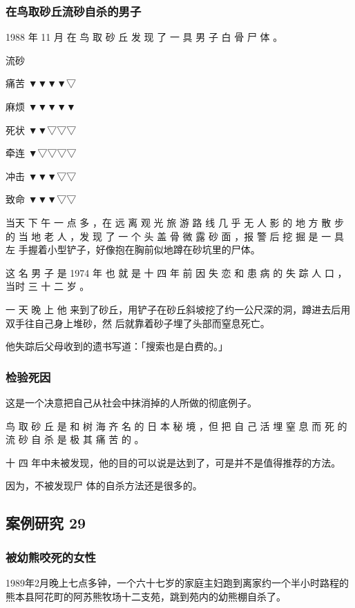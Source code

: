 \documentclass[UTF8]{ctexart}
\begin{document}
\subsubsection*{在鸟取砂丘流砂自杀的男子}

1988 年 11 月 在 鸟 取 砂 丘 发 现 了 一 具 男 子 白 骨 尸 体 。

流砂

痛苦 ▼▼▼▼▽

麻烦 ▼▼▼▼▼

死状 ▼▼▽▽▽

牵连 ▼▽▽▽▽

冲击 ▼▼▼▽▽

致命 ▼▼▼▽▽

当天 下 午 一 点 多 ，在 远 离 观 光 旅 游 路 线 几 乎 无 人 影 的 地 方 散 步 的 当 地 老 人 ，发 现 了 一 个 头 盖 骨 微 露 砂 面 ，报 警 后 挖 掘 是 一 具 左 手握着小型铲子，好像抱在胸前似地蹲在砂坑里的尸体。

这 名 男 子 是 1974 年 也 就 是 十 四 年 前 因 失 恋 和 患 病 的 失 踪 人 口 ，当时 三 十 二 岁 。

一 天 晚 上 他 来到了砂丘，用铲子在砂丘斜坡挖了约一公尺深的洞，蹲进去后用双手往自己身上堆砂，然 后就靠着砂子埋了头部而窒息死亡。 

他失踪后父母收到的遗书写道：「搜索也是白费的。」

\subsubsection*{检验死因}

这是一个决意把自己从社会中抹消掉的人所做的彻底例子。

鸟 取 砂 丘 是 和 树 海 齐 名 的 日 本 秘 境 ，但 把 自 己 活 埋 窒 息 而 死 的 流 砂 自 杀 是 极 其 痛 苦 的 。

十 四 年中未被发现，他的目的可以说是达到了，可是并不是值得推荐的方法。

因为，不被发现尸 体的自杀方法还是很多的。


\subsection{案例研究 29}

\subsubsection*{被幼熊咬死的女性}

1989年2月晚上七点多钟，一个六十七岁的家庭主妇跑到离家约一个半小时路程的熊本县阿花町的阿苏熊牧场十二支苑，跳到苑内的幼熊棚自杀了。
\end{document}
